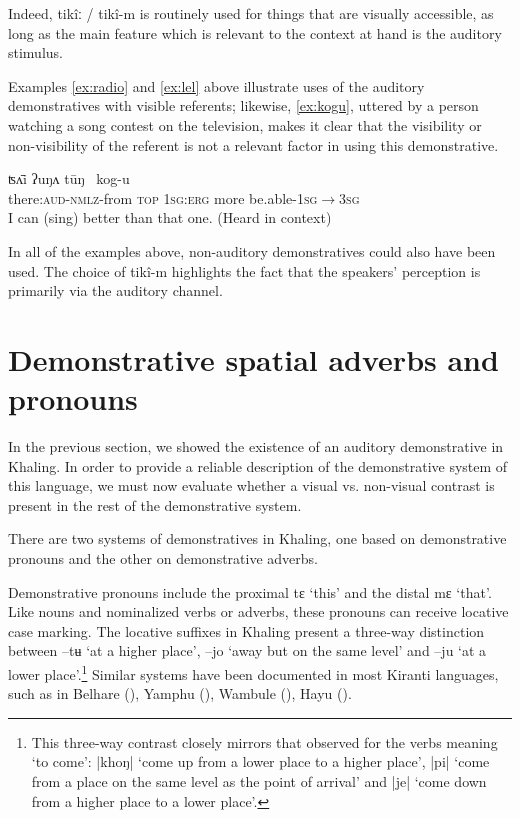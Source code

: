 \documentclass[oldfontcommands,oneside,a4paper,11pt]{article}
\newcommand{\ipa}[1]{{\phon \mbox{#1}}} %
\begin{document}
Indeed, \ipa{tikîː} / \ipa{tikî-m} is routinely used for things that are visually accessible, as long as the main feature which is relevant to the context at hand is the auditory stimulus.
 
Examples \ref{ex:radio} and \ref{ex:lel} above illustrate uses of the auditory demonstratives with visible referents; likewise,   \ref{ex:kogu}, uttered by a person watching a song contest on the television, makes it clear that the visibility or non-visibility of the referent is not a relevant factor in using this demonstrative.

\begin{exe}
\ex \label{ex:kogu}
\gll  	\ipa{tikî-m-kʌ}   	\ipa{ʦʌ̄i} \ipa{ʔuŋʌ} \ipa{tūŋ }   	\ipa{kog-u}   \\
there:\textsc{aud}-\textsc{nmlz}-from \textsc{top} \textsc{1sg:erg} more be.able-\textsc{1sg$\rightarrow$3sg}	  \\
\glt I can (sing) better than that one. (Heard in context)
\end{exe}

 

In all of the examples above, non-auditory demonstratives could also have been used. The choice of \ipa{tikî-m}  highlights the  fact that the  speakers' perception is primarily via the auditory channel.
 
 
 \section{Demonstrative spatial adverbs and pronouns} \label{sec:spatial}
In the previous section, we   showed the existence of an auditory demonstrative in Khaling. In order to provide a reliable description of the demonstrative system of this language, we must now evaluate whether a visual vs. non-visual contrast is present in the rest of the demonstrative system. 



There are two systems of demonstratives in Khaling, one based on demonstrative pronouns and the other   on demonstrative adverbs.

Demonstrative pronouns include the  proximal \ipa{tɛ} `this' and the distal \ipa{mɛ} `that'. Like nouns and nominalized verbs or adverbs, these pronouns can receive locative case marking. The locative suffixes  in Khaling present a three-way distinction between \ipa{--tʉ} `at a higher place', \ipa{--jo} `away but on the same level' and \ipa{--ju} `at a lower place'.\footnote{This three-way contrast closely mirrors that observed for the verbs meaning `to come': \ipa{|khoŋ|} `come up from a lower place to a higher place', \ipa{|pi|} `come from a place on the same level as the point of arrival' and \ipa{|je|} `come down from a higher place to a lower place'.} Similar systems have been documented in most Kiranti languages, such as in Belhare (\citealt{bickel01deictic}), Yamphu (\citealt[96-99]{rutgers98yamphu}), Wambule (\citealt[208-16]{opgenort04wambule}), Hayu (\citealt[121]{michailovsky88}).
\end{document}
